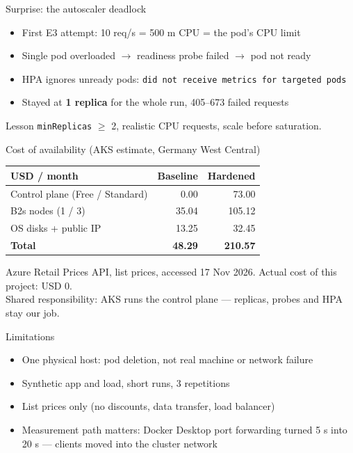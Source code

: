 \documentclass[aspectratio=169,11pt]{beamer}
\begin{document}
\begin{frame}{Surprise: the autoscaler deadlock}
	\begin{itemize}
		\item First E3 attempt: 10 req/s = 500 m CPU = the pod's CPU limit
		\item Single pod overloaded $\to$ readiness probe failed $\to$ pod \alert{not ready}
		\item HPA ignores unready pods: \texttt{did not receive metrics for targeted pods}
		\item Stayed at \textbf{1 replica} for the whole run, 405--673 failed requests
	\end{itemize}
	\vspace{0.5em}
	\begin{block}{Lesson}
		\texttt{minReplicas} $\geq$ 2, realistic CPU requests, scale before saturation.
	\end{block}
\end{frame}

\begin{frame}{Cost of availability (AKS estimate, Germany West Central)}
	\centering
	\begin{tabular}{lrr}
		\toprule
		USD / month & Baseline & Hardened \\
		\midrule
		Control plane (Free / Standard) & 0.00 & 73.00 \\
		B2s nodes (1 / 3) & 35.04 & 105.12 \\
		OS disks + public IP & 13.25 & 32.45 \\
		\midrule
		\textbf{Total} & \textbf{48.29} & \textbf{210.57} \\
		\bottomrule
	\end{tabular}
	\vspace{0.8em}

	\small Azure Retail Prices API, list prices, accessed 17 Nov 2026. Actual cost of this project: USD 0.\\
	Shared responsibility: AKS runs the control plane --- replicas, probes and HPA stay \alert{our} job.
\end{frame}

\begin{frame}{Limitations}
	\begin{itemize}
		\item One physical host: pod deletion, not real machine or network failure
		\item Synthetic app and load, short runs, 3 repetitions
		\item List prices only (no discounts, data transfer, load balancer)
		\item Measurement path matters: Docker Desktop port forwarding turned 5 s into 20 s --- clients moved into the cluster network
	\end{itemize}
\end{frame}
\end{document}
